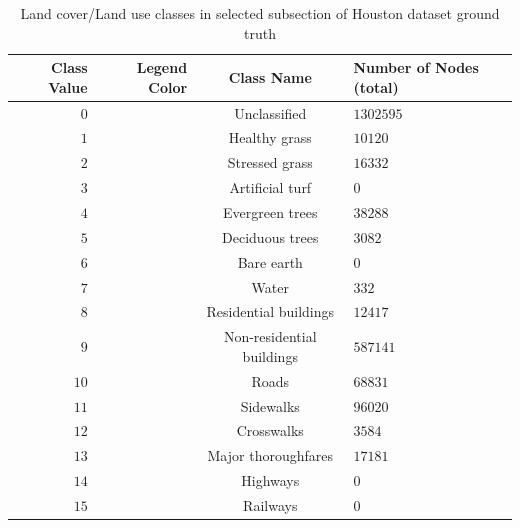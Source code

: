\documentclass[journal]{IEEEtran}
\begin{document}
\begin{table}
\caption{Land cover/Land use classes in selected subsection of Houston dataset ground truth}
\label{tab::classes}
\centering
\begin{tabular}{NNcZ}
\hline
\bfseries Class Value & \bfseries Legend Color & \bfseries Class Name & \bfseries Number of Nodes (total)\\
\hline
$0$ & \colorbox[rgb]{0.0,0.0,0.0}{\textcolor{white}{\phantom{A}}} & Unclassified & $1302595$\\
$1$ & \colorbox[rgb]{0.0,1.0,0.03}{\textcolor{white}{\phantom{A}}} & Healthy grass & $10120$ \\
$2$ & \colorbox[rgb]{0.21, 0.69, 0.15}{\textcolor{white}{\phantom{A}}} & Stressed grass & $16332$ \\
$3$ & \colorbox[rgb]{0.53, 0.73, 0.57}{\textcolor{white}{\phantom{A}}} & Artificial turf & $0$ \\
$4$ & \colorbox[rgb]{0.  , 0.47, 0.08}{\textcolor{white}{\phantom{A}}} & Evergreen trees & $38288$ \\
$5$ & \colorbox[rgb]{0.  , 0.3 , 0.}{\textcolor{white}{\phantom{A}}} & Deciduous trees & $3082$ \\
$6$ & \colorbox[rgb]{0.75, 0.48, 0.08}{\textcolor{white}{\phantom{A}}} & Bare earth & $0$ \\
$7$ & \colorbox[rgb]{0.  , 0.89, 0.89}{\textcolor{white}{\phantom{A}}} & Water & $332$ \\
$8$ & \colorbox[rgb]{0.98, 0.98, 0.98}{\textcolor{white}{\phantom{A}}} & Residential buildings & $12417$ \\
$9$ & \colorbox[rgb]{0.94, 0.76, 0.92}{\textcolor{white}{\phantom{A}}} & Non-residential buildings & $587141$ \\
$10$ & \colorbox[rgb]{1.  , 0.35, 0.36}{\textcolor{white}{\phantom{A}}} & Roads & $68831$ \\
$11$ & \colorbox[rgb]{0.64, 0.64, 0.64}{\textcolor{white}{\phantom{A}}} & Sidewalks & $96020$ \\
$12$ & \colorbox[rgb]{0.36, 0.36, 0.36}{\textcolor{white}{\phantom{A}}} & Crosswalks & $3584$ \\
$13$ & \colorbox[rgb]{0.79, 0.  , 0.01}{\textcolor{white}{\phantom{A}}} & Major thoroughfares & $17181$ \\
$14$ & \colorbox[rgb]{0.54, 0.  , 0.04}{\textcolor{white}{\phantom{A}}} & Highways & $0$ \\
$15$ & \colorbox[rgb]{1.  , 0.65, 0.07}{\textcolor{white}{\phantom{A}}} & Railways & $0$ \\

\end{tabular}
\end{table}
\end{document}
